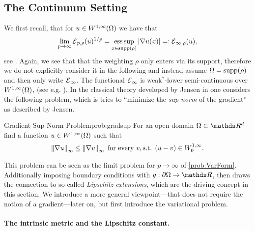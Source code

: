 \subsection{The Continuum Setting}\label{sec:LipExtCont}
%
%
We first recall, that for 
$u\in W^{1,\infty}(\Omega)$ we have that
%
\begin{align*}
\lim_{p\to\infty} \mathcal{E}{}_{p,\rho}(u)^{1/p} = \operatorname*{ess\,sup}_{x\in\mathrm{supp}(\rho)} \left|\nabla u(x)\right| =: \mathcal{E}{}_{\infty,\rho}(u),
\end{align*}
%
see \cite{jensen1993uniqueness}. Again, we see that that the weighting $\rho$ only enters via its support, therefore we do not explicitly consider it in the following and instead assume $\Omega=\mathrm{supp}(\rho)$ and then only write $\mathcal{E}{}_{\infty}$. The functional $\mathcal{E}{}_\infty$ is weak$^*$-lower semi-continuous over $W^{1,\infty}(\Omega)$, (see e.g. \cite[Thm. 2.6]{barron2001lower}). In the classical theory developed by Jensen in \cite{jensen1993uniqueness} one considers the following problem, which is tries to \enquote{minimize the \emph{sup-norm} of the gradient} as described by Jensen.
%
\begin{problem}{Gradient Sup-Norm Problem}{prob:gradsup}
For an open domain $\domain\subset\R^d$ find a function $u\in W^{1,\infty}(\Omega)$ such that
%
\begin{align*}
\left\|\nabla u\right\|_\infty \leq \left\|\nabla v\right\|_\infty \text{ for every } v, \text{s.t. } (u-v)\in W^{1,\infty}_0.
\end{align*}
\end{problem}
%
\noindent%
This problem can be seen as the limit problem for $p\to\infty$ of \cref{prob:VarForm}. Additionally imposing boundary conditions with $g:\partial\domain\to\R$, \cite{jensen1993uniqueness} then draws the connection to so-called \emph{Lipschitz extensions}, which are the driving concept in this section. We introduce a more general viewpoint---that does not require the notion of a gradient---later on, but first introduce the variational problem. 

\paragraph{The intrinsic metric and the Lipschitz constant.}

